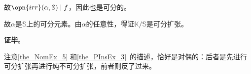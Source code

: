 故$\opn{irr}(\alpha, \mathbb{S})\mid f$，因此也是可分的。

故$\alpha$是$\mathbb{S}$上的可分元素。由$\alpha$的任意性，得证$\mathbb{K}/\mathbb{S}$是可分扩张。

\textbf{证毕}。

注意\autoref{the_NomEx_5} 和\autoref{the_PInsEx_3}~的描述，恰好是对偶的：后者是先进行可分扩张再进行纯不可分扩张，前者则反了过来。





























